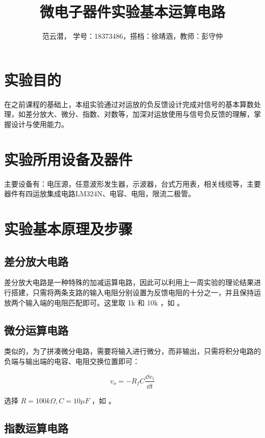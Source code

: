 \documentclass[lang=cn,11pt,a4paper,cite=authoryear]{elegantpaper}
\title{微电子器件实验\quad 基本运算电路}
\author{范云潜， 学号：18373486，搭档：徐靖涵，教师：彭守仲}
\institute{微电子学院 184111 班}
\date{\zhtoday}
\begin{document}
\maketitle


\section{实验目的}

在之前课程的基础上，本组实验通过对运放的负反馈设计完成对信号的基本算数处理，如差分放大、微分、指数、对数等，加深对运放使用与信号负反馈的理解，掌握设计与使用能力。

\section{实验所用设备及器件}


主要设备有：电压源，任意波形发生器，示波器，台式万用表，相关线缆等，主要器件有四运放集成电路LM324N、电容、电阻，限流二极管。

\section{实验基本原理及步骤}

\subsection{差分放大电路}

差分放大电路是一种特殊的加减运算电路，因此可以利用上一周实验的理论结果进行搭建，只需将两条支路的输入电阻分别设置为反馈电阻的十分之一，并且保持运放两个输入端的电阻匹配即可。这里取 1k 和 10k ，如  。


\subsection{微分运算电路}

类似的，为了拼凑微分电路，需要将输入进行微分，而非输出，只需将积分电路的负端与输出端的电容、电阻交换位置即可：

\[v_o =  - R_f C \frac{\dd{v_i}}{\dd{t}}\]

选择 \(R = 100k \Omega, C = 10 \mu F\) ，如  。


\subsection{指数运算电路}
\end{document}
